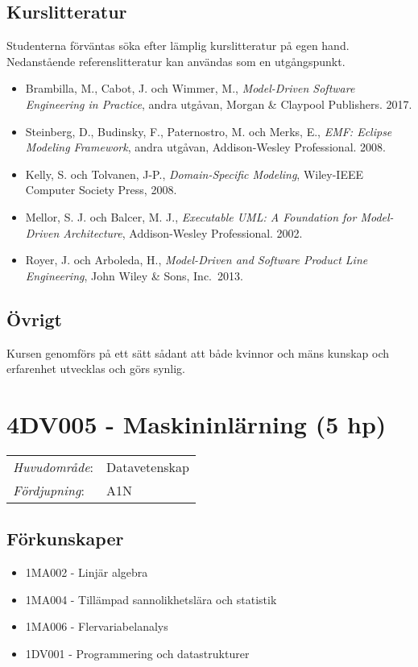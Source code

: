 \subsection*{Kurslitteratur}

Studenterna förväntas söka efter lämplig kurslitteratur på egen hand.
Nedanstående referenslitteratur kan användas som en utgångspunkt.

\begin{itemize}
\tightlist
\item
  Brambilla, M., Cabot, J. och Wimmer, M., \emph{Model-Driven Software
  Engineering in Practice}, andra utgåvan, Morgan \& Claypool
  Publishers. 2017.
\item
  Steinberg, D., Budinsky, F., Paternostro, M. och Merks, E., \emph{EMF:
  Eclipse Modeling Framework}, andra utgåvan, Addison-Wesley
  Professional. 2008.
\item
  Kelly, S. och Tolvanen, J-P., \emph{Domain-Specific Modeling},
  Wiley-IEEE Computer Society Press, 2008.
\item
  Mellor, S. J. och Balcer, M. J., \emph{Executable UML: A Foundation
  for Model-Driven Architecture}, Addison-Wesley Professional. 2002.
\item
  Royer, J. och Arboleda, H., \emph{Model-Driven and Software Product
  Line Engineering}, John Wiley \& Sons, Inc.~2013.
\end{itemize}

\subsection*{Övrigt}

Kursen genomförs på ett sätt sådant att både kvinnor och mäns kunskap och erfarenhet utvecklas och görs synlig.
\pagebreak
\section*{4DV005 - Maskininlärning (5 hp)}

\begin{tabular}{ll}\emph{Huvudområde}: & Datavetenskap\tabularnewline\emph{Fördjupning}: & A1N\tabularnewline\end{tabular}

\subsection*{Förkunskaper}

\begin{itemize}
\tightlist
\item
  1MA002 - Linjär algebra
\item
  1MA004 - Tillämpad sannolikhetslära och statistik
\item
  1MA006 - Flervariabelanalys
\item
  1DV001 - Programmering och datastrukturer
\end{itemize}

